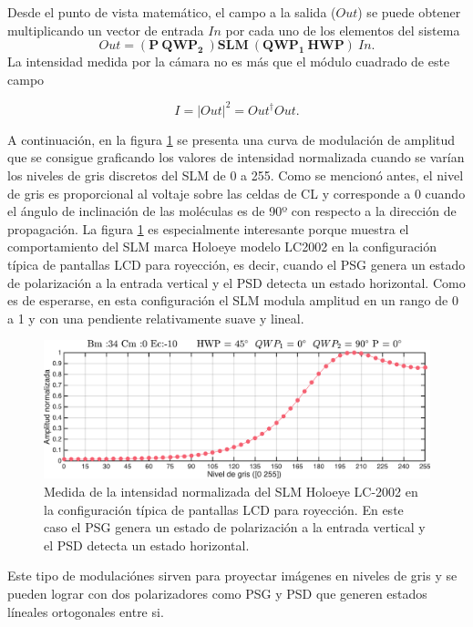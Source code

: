 Desde el punto de vista matemático, el campo a la salida ($Out$) se puede
obtener multiplicando un vector de entrada $In$ por cada uno de
los elementos del sistema 
\begin{equation}
\label{eq:ChGV_Out}
Out = \left( \mathbf{P}\ \mathbf{QWP_2}\ \right) \mathbf{SLM}\ \left( \mathbf{QWP_1}\
\mathbf{HWP}\right)\ In.
\end{equation}
La intensidad medida por la cámara no es más que el módulo cuadrado de
este campo

\begin{equation}
I = |Out|^2 = Out^{\dagger}Out.
\end{equation}

A continuación, en la figura \ref{fig:amp_H_V_SLM_2002} se presenta
una curva de modulación de amplitud que se consigue graficando los
valores de intensidad normalizada cuando se varían los niveles de gris discretos
del SLM de 0 a 255. Como se mencionó antes, el nivel de gris es
proporcional al voltaje sobre las celdas de CL y corresponde a 0
cuando el ángulo de inclinación de las moléculas es de 90º con
respecto a la dirección de propagación. La
figura \ref{fig:amp_H_V_SLM_2002} es especialmente interesante porque
muestra el comportamiento del SLM marca Holoeye modelo LC2002 en la
configuración típica de pantallas LCD para royección, es decir, cuando
el PSG genera un estado de polarización a la entrada vertical y el
PSD detecta un estado horizontal. Como es de esperarse, en esta
configuración el SLM modula amplitud en un rango de 0 a 1 y con una
pendiente relativamente suave y lineal. 
\begin{figure}[h!]
\centering
\includegraphics[scale=.55]{amp_H_V_SLM_2002.pdf}
\caption[Curva de modulación de amplitud para un estado no
óptimo]{Medida de la intensidad normalizada del SLM Holoeye LC-2002 en la configuración típica
  de pantallas LCD para royección. En este caso el PSG genera un estado de
  polarización a la entrada vertical y el PSD detecta un estado horizontal.}
\label{fig:amp_H_V_SLM_2002}
\end{figure}
Este tipo de modulaciónes
sirven para proyectar imágenes en niveles de gris y se pueden lograr
con dos polarizadores como PSG y PSD que generen estados líneales ortogonales
entre si.

